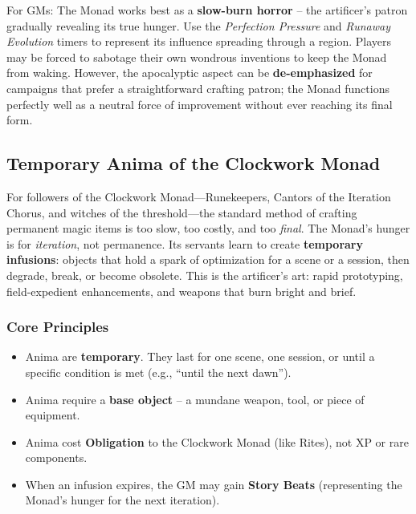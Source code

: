 For GMs: The Monad works best as a \textbf{slow-burn horror} -- the artificer's patron gradually revealing its true hunger. Use the \textit{Perfection Pressure} and \textit{Runaway Evolution} timers to represent its influence spreading through a region. Players may be forced to sabotage their own wondrous inventions to keep the Monad from waking. However, the apocalyptic aspect can be \textbf{de-emphasized} for campaigns that prefer a straightforward crafting patron; the Monad functions perfectly well as a neutral force of improvement without ever reaching its final form.


\subsection{Temporary Anima of the Clockwork Monad}
\label{subsec:monad-infusions}

For followers of the Clockwork Monad---Runekeepers, Cantors of the Iteration Chorus, and witches of the threshold---the standard method of crafting permanent magic items is too slow, too costly, and too \textit{final}. The Monad's hunger is for \textit{iteration}, not permanence. Its servants learn to create \textbf{temporary infusions}: objects that hold a spark of optimization for a scene or a session, then degrade, break, or become obsolete. This is the artificer's art: rapid prototyping, field-expedient enhancements, and weapons that burn bright and brief.

\subsubsection*{Core Principles}
\begin{itemize}
  \item Anima are \textbf{temporary}. They last for one scene, one session, or until a specific condition is met (e.g., ``until the next dawn'').
  \item Anima require a \textbf{base object} -- a mundane weapon, tool, or piece of equipment.
  \item Anima cost \textbf{Obligation} to the Clockwork Monad (like Rites), not XP or rare components.
  \item When an infusion expires, the GM may gain \textbf{Story Beats} (representing the Monad's hunger for the next iteration).
\end{itemize}

